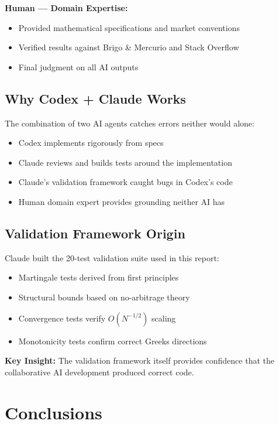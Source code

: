 \documentclass[11pt,a4paper]{article}
\begin{document}
\textbf{Human --- Domain Expertise:}
\begin{itemize}
    \item Provided mathematical specifications and market conventions
    \item Verified results against Brigo \& Mercurio and Stack Overflow
    \item Final judgment on all AI outputs
\end{itemize}

\subsection{Why Codex + Claude Works}

The combination of two AI agents catches errors neither would alone:
\begin{itemize}
    \item Codex implements rigorously from specs
    \item Claude reviews and builds tests around the implementation
    \item Claude's validation framework caught bugs in Codex's code
    \item Human domain expert provides grounding neither AI has
\end{itemize}

\subsection{Validation Framework Origin}

Claude built the 20-test validation suite used in this report:
\begin{itemize}
    \item Martingale tests derived from first principles
    \item Structural bounds based on no-arbitrage theory
    \item Convergence tests verify $O(N^{-1/2})$ scaling
    \item Monotonicity tests confirm correct Greeks directions
\end{itemize}

\textbf{Key Insight:} The validation framework itself provides confidence that the collaborative AI development produced correct code.

\section{Conclusions}
\end{document}
